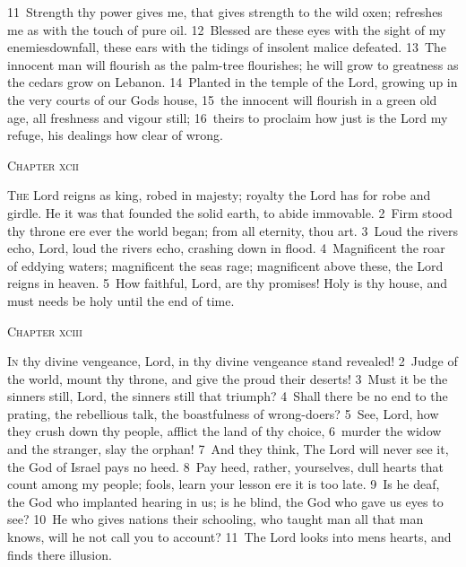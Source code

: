 \documentclass[10pt]{book} %
\begin{document}
\textcolor{benred8}{11}~Strength thy power gives me, that gives strength to the wild oxen; refreshes me as with the touch of pure oil. \textcolor{benred8}{12}~Blessed are these eyes with the sight of my enemies\textquotesingle  downfall, these ears with the tidings of insolent malice defeated. \textcolor{benred8}{13}~The innocent man will flourish as the palm-tree flourishes; he will grow to greatness as the cedars grow on Lebanon. \textcolor{benred8}{14}~Planted in the temple of the Lord, growing up in the very courts of our God\textquotesingle s house, \textcolor{benred8}{15}~the innocent will flourish in a green old age, all freshness and vigour still; \textcolor{benred8}{16}~theirs to proclaim how just is the Lord my refuge, his dealings how clear of wrong.
\begin{large}\begin{center}\textsc{Chapter xcii}\end{center}\end{large}
\lettrine[lines=2]{T}{he} Lord reigns as king, robed in majesty; royalty the Lord has for robe and girdle. He it was that founded the solid earth, to abide immovable. \textcolor{benred8}{2}~Firm stood thy throne ere ever the world began; from all eternity, thou art. \textcolor{benred8}{3}~Loud the rivers echo, Lord, loud the rivers echo, crashing down in flood. \textcolor{benred8}{4}~Magnificent the roar of eddying waters; magnificent the sea\textquotesingle s rage; magnificent above these, the Lord reigns in heaven. \textcolor{benred8}{5}~How faithful, Lord, are thy promises! Holy is thy house, and must needs be holy until the end of time.
\begin{large}\begin{center}\textsc{Chapter xciii}\end{center}\end{large}
\lettrine[lines=2]{I}{n} thy divine vengeance, Lord, in thy divine vengeance stand revealed! \textcolor{benred8}{2}~Judge of the world, mount thy throne, and give the proud their deserts! \textcolor{benred8}{3}~Must it be the sinners still, Lord, the sinners still that triumph? \textcolor{benred8}{4}~Shall there be no end to the prating, the rebellious talk, the boastfulness of wrong-doers? \textcolor{benred8}{5}~See, Lord, how they crush down thy people, afflict the land of thy choice, \textcolor{benred8}{6}~murder the widow and the stranger, slay the orphan! \textcolor{benred8}{7}~And they think, The Lord will never see it, the God of Israel pays no heed. \textcolor{benred8}{8}~Pay heed, rather, yourselves, dull hearts that count among my people; fools, learn your lesson ere it is too late. \textcolor{benred8}{9}~Is he deaf, the God who implanted hearing in us; is he blind, the God who gave us eyes to see? \textcolor{benred8}{10}~He who gives nations their schooling, who taught man all that man knows, will he not call you to account? \textcolor{benred8}{11}~The Lord looks into men\textquotesingle s hearts, and finds there illusion.
\end{document}
